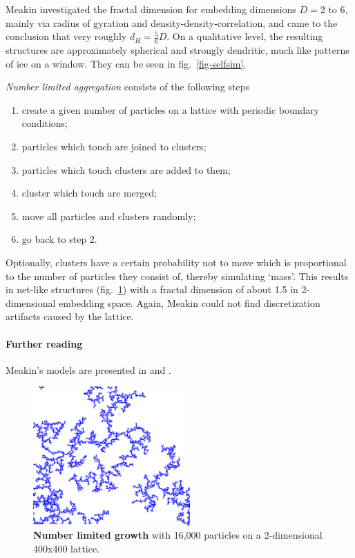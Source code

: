 \documentclass[twocolumn,10pt]{scrartcl}
\begin{document}
        Meakin investigated the fractal dimension for embedding dimensions $D=2$ to 6, mainly via radius of gyration
        and density-density-correlation, and came to the conclusion that very roughly $d_H=\frac{5}{6}D$.
        On a qualitative level, the resulting structures are approximately spherical and strongly dendritic,
        much like patterns of ice on a window. They can be seen in fig.~\ref{fig-selfsim}.

        \emph{Number limited aggregation} consists of the following steps
        \begin{enumerate}
            \item create a given number of particles on a lattice with periodic boundary conditions;
            \item particles which touch are joined to clusters;
            \item particles which touch clusters are added to them;
            \item cluster which touch are merged;
            \item move all particles and clusters randomly;
            \item go back to step 2.
        \end{enumerate}
        Optionally, clusters have a certain probability not to move which is proportional to the number of
        particles they consist of, thereby simulating `mass'. This results in net-like structures
        (fig.~\ref{fig-meakin2}) with a fractal dimension of about 1.5 in 2-dimensional embedding space. Again, Meakin
        could not find discretization artifacts caused by the lattice.

        {\small
            \paragraph{Further reading}
            Meakin's models are presented in \cite{src-meakin1} and \cite{src-meakin2}.
        }

        \begin{figure}
            \center
            \includegraphics[width=6cm]{img/meakin2.png}
            \caption[Number limited growth]
                {\small\textbf{Number limited growth} with 16,000 particles on a 2-dimensional 400x400 lattice.}
            \label{fig-meakin2}
        \end{figure}
\end{document}
